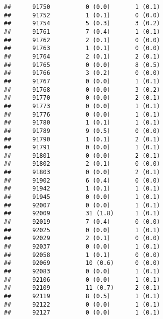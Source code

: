 \documentclass[]{article}
\begin{document}
\begin{verbatim}
##      91750          0 (0.0)       1 (0.1)                        
##      91752          1 (0.1)       0 (0.0)                        
##      91754          5 (0.3)       3 (0.2)                        
##      91761          7 (0.4)       1 (0.1)                        
##      91762          2 (0.1)       0 (0.0)                        
##      91763          1 (0.1)       0 (0.0)                        
##      91764          2 (0.1)       2 (0.1)                        
##      91765          0 (0.0)       8 (0.5)                        
##      91766          3 (0.2)       0 (0.0)                        
##      91767          0 (0.0)       1 (0.1)                        
##      91768          0 (0.0)       3 (0.2)                        
##      91770          0 (0.0)       2 (0.1)                        
##      91773          0 (0.0)       1 (0.1)                        
##      91776          0 (0.0)       1 (0.1)                        
##      91780          1 (0.1)       1 (0.1)                        
##      91789          9 (0.5)       0 (0.0)                        
##      91790          1 (0.1)       2 (0.1)                        
##      91791          0 (0.0)       1 (0.1)                        
##      91801          0 (0.0)       2 (0.1)                        
##      91802          2 (0.1)       0 (0.0)                        
##      91803          0 (0.0)       2 (0.1)                        
##      91902          6 (0.4)       0 (0.0)                        
##      91942          1 (0.1)       1 (0.1)                        
##      91945          0 (0.0)       1 (0.1)                        
##      92007          0 (0.0)       1 (0.1)                        
##      92009          31 (1.8)      1 (0.1)                        
##      92019          7 (0.4)       0 (0.0)                        
##      92025          0 (0.0)       1 (0.1)                        
##      92029          2 (0.1)       0 (0.0)                        
##      92037          0 (0.0)       1 (0.1)                        
##      92058          1 (0.1)       0 (0.0)                        
##      92069          10 (0.6)      0 (0.0)                        
##      92083          0 (0.0)       1 (0.1)                        
##      92106          0 (0.0)       1 (0.1)                        
##      92109          11 (0.7)      2 (0.1)                        
##      92119          8 (0.5)       1 (0.1)                        
##      92122          0 (0.0)       1 (0.1)                        
##      92127          0 (0.0)       1 (0.1)                        

\end{verbatim}
\end{document}
